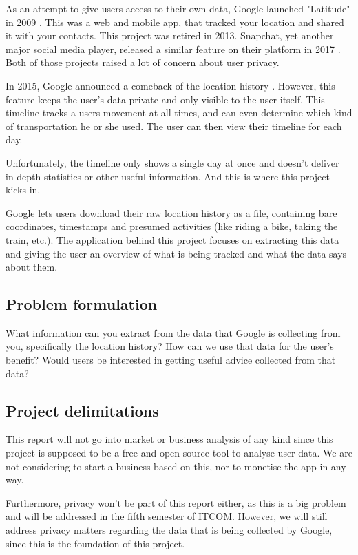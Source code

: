 \documentclass[12p]{article}
\begin{document}
		As an attempt to give users access to their own data, Google launched "Latitude" in 2009 \cite{GoogleLatitude}. This was a web and mobile app, that tracked your location and shared it with your contacts. This project was retired in 2013. Snapchat, yet another major social media player, released a similar feature on their platform in 2017 \cite{SnapchatMap}. Both of those projects raised a lot of concern about user privacy.
		
		In 2015, Google announced a comeback of the location history \cite{TimelineAnnouncement}. However, this feature keeps the user's data private and only visible to the user itself. This timeline tracks a users movement at all times, and can even determine which kind of transportation he or she used. The user can then view their timeline for each day.
		
		Unfortunately, the timeline only shows a single day at once and doesn't deliver in-depth statistics or other useful information. And this is where this project kicks in. 
		
		Google lets users download their raw location history as a file, containing bare coordinates, timestamps and presumed activities (like riding a bike, taking the train, etc.). The application behind this project focuses on extracting this data and giving the user an overview of what is being tracked and what the data says about them.
		
		\subsection{Problem formulation} \label{ProblemFormulation}
		
		What information can you extract from the data that Google is collecting from you, specifically the location history? How can we use that data for the user’s benefit? Would users be interested in getting useful advice collected from that data?
		
		
		\subsection{Project delimitations} \label{ProjectDelimitations}
		
		This report will not go into market or business analysis of any kind since this project is supposed to be a free and open-source tool to analyse user data. We are not considering to start a business based on this, nor to monetise the app in any way.
		
		Furthermore, privacy won't be part of this report either, as this is a big problem and will be addressed in the fifth semester of ITCOM. However, we will still address privacy matters regarding the data that is being collected by Google, since this is the foundation of this project.
		
\end{document}
